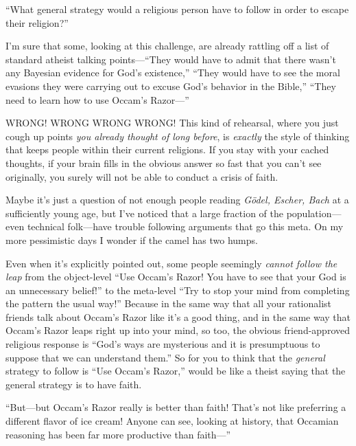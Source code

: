 {
 ``What general strategy would a religious person
have to follow in order to escape their religion?''}

{
 I'm sure that some, looking at this challenge, are
already rattling off a list of standard atheist talking
points---``They would have to admit that there
wasn't any Bayesian evidence for God's
existence,'' ``They would have to
see the moral evasions they were carrying out to excuse
God's behavior in the Bible,''
``They need to learn how to use
Occam's Razor---''}

{
 WRONG! WRONG WRONG WRONG! This kind of rehearsal, where you just
cough up points \textit{you already thought of long before}, is
\textit{exactly} the style of thinking that keeps people within their
current religions. If you stay with your cached thoughts, if your brain
fills in the obvious answer so fast that you can't see
originally, you surely will not be able to conduct a crisis of faith.}

{
 Maybe it's just a question of not enough people
reading \textit{Gödel, Escher, Bach} at a sufficiently young age, but
I've noticed that a large fraction of the
population---even technical folk---have trouble following arguments
that go this meta. On my more pessimistic days I wonder if the camel
has two humps.}

{
 Even when it's explicitly pointed out, some people
seemingly \textit{cannot follow the leap} from the object-level
``Use Occam's Razor! You have to see
that your God is an unnecessary belief!'' to the
meta-level ``Try to stop your mind from completing the
pattern the usual way!'' Because in the same way that
all your rationalist friends talk about Occam's Razor
like it's a good thing, and in the same way that
Occam's Razor leaps right up into your mind, so too,
the obvious friend-approved religious response is
``God's ways are mysterious and it is
presumptuous to suppose that we can understand
them.'' So for you to think that the \textit{general}
strategy to follow is ``Use Occam's
Razor,'' would be like a theist saying that the
general strategy is to have faith.}

{
 ``But---but Occam's Razor really
is better than faith! That's not like preferring a
different flavor of ice cream! Anyone can see, looking at history, that
Occamian reasoning has been far more productive than
faith---''}

